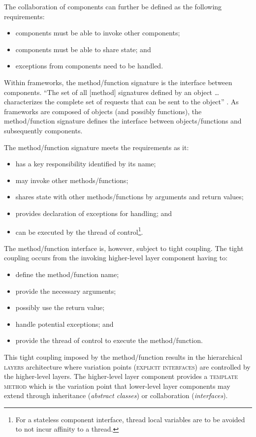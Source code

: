 \documentclass[prodmode]{style/acmlarge}
\begin{document}
The collaboration of components can further be defined as the following
requirements:
\begin{itemize}
  \item components must be able to invoke other components;
  \item components must be able to share state; and
  \item exceptions from components need to be handled.
\end{itemize}

Within frameworks, the method/function signature is the interface between
components.  ``The set of all [method] signatures defined by an object \ldots
characterizes the complete set of requests that can be sent to the object''
\cite[p. 13]{gof}.  As frameworks are composed of objects (and possibly
functions), the method/function signature defines the interface between
objects/functions and subsequently components.

The method/function signature meets the requirements as it:
\begin{itemize}
  \item has a key responsibility identified by its name;
  \item may invoke other methods/functions;
  \item shares state with other methods/functions by arguments and return values;
  \item provides declaration of exceptions for handling; and
  \item can be executed by the thread of control\footnote{For a stateless component interface, thread local variables are to be avoided to not incur affinity to a thread.}.
\end{itemize}

The method/function interface is, however, subject to tight coupling.  The tight
coupling occurs from the invoking higher-level layer component having to:
\begin{itemize}
  \item define the method/function name;
  \item provide the necessary arguments;
  \item possibly use the return value;
  \item handle potential exceptions; and
  \item provide the thread of control to execute the method/function.
\end{itemize}

This tight coupling imposed by the method/function results in the hierarchical
\textsc{layers} architecture where variation points (\textsc{explicit
interfaces}) are controlled by the higher-level layers.  The higher-level layer
component provides a \textsc{template method} \cite{gof} which is the variation
point that lower-level layer components may extend through inheritance
(\textit{abstract classes}) or collaboration (\textit{interfaces}).
\end{document}
